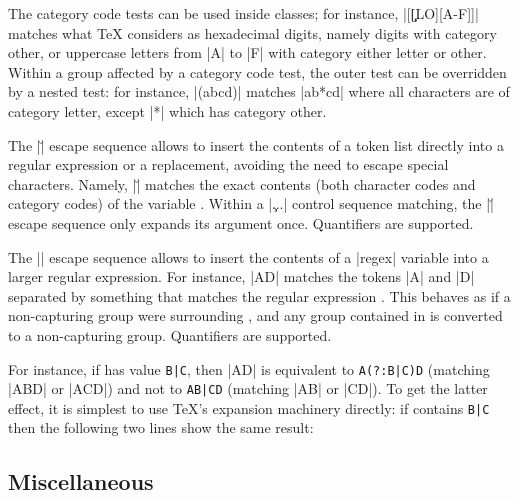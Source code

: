 \documentclass[oneside]{book}
\begin{document}
The category code tests can be used inside classes; for instance,
|[\cO\d \c[LO][A-F]]| matches what \TeX{} considers as hexadecimal
digits, namely digits with category other, or uppercase letters from
|A| to |F| with category either letter or other. Within a group
affected by a category code test, the outer test can be overridden by
a nested test: for instance, |\cL(ab\cO\*cd)| matches |ab*cd| where
all characters are of category letter, except |*| which has category
other.

The |\u| escape sequence allows to insert the contents of a token list
directly into a regular expression or a replacement, avoiding the need
to escape special characters. Namely, |\u| matches
the exact contents (both character codes and category codes) of the
variable . %
Within a |\c{...}|
control sequence matching, the |\u| escape sequence only expands its
argument once. %
Quantifiers are supported.

The |\ur| escape sequence allows to insert the contents of a |regex|
variable into a larger regular expression.  For instance,
|AD| matches the tokens |A| and |D| separated by
something that matches the regular expression
.  This behaves as if a non-capturing group
were surrounding , and any group contained
in  is converted to a non-capturing group.
Quantifiers are supported.

For instance, if  has value \verb"B|C",
then |AD| is equivalent to \verb"A(?:B|C)D" (matching
|ABD| or |ACD|) and not to \verb"AB|CD" (matching |AB| or |CD|).  To
get the latter effect, it is simplest to use \TeX{}'s expansion
machinery directly: if  contains
\verb"B|C" then the following two lines show the same result:
\begin{codehigh}
\end{codehigh}

\subsection{Miscellaneous}
\end{document}
